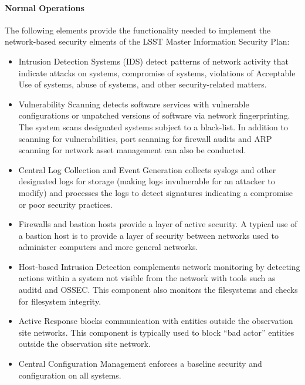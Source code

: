 \paragraph{Normal Operations}

The following elements provide the functionality needed to implement the
network-based security elments of the LSST Master Information Security Plan:

\begin{itemize}

\item Intrusion Detection Systems (IDS) detect patterns of network activity that
indicate attacks on systems, compromise of systems, violations of Acceptable Use
of systems, abuse of systems, and other security-related matters.

\item Vulnerability Scanning detects software services with vulnerable
configurations or unpatched versions of software via network fingerprinting. The
system scans designated systems subject to a black-list. In addition to scanning
for vulnerabilities, port scanning for firewall audits and ARP scanning for
network asset management can also be conducted.

\item Central Log Collection and Event Generation collects syslogs and other
designated logs for storage (making logs invulnerable for an attacker to modify)
and processes the logs to detect signatures indicating a compromise or poor
security practices.

\item Firewalls and bastion hosts provide a layer of active security. A typical
use of a bastion host is to provide a layer of security between networks used to
administer computers and more general networks.

\item Host-based Intrusion Detection complements network monitoring by detecting
actions within a system not visible from the network with tools such as auditd
and OSSEC. This component also monitors the filesystems and checks for filesystem
integrity.

\item Active Response blocks communication with entities outside the observation site
networks. This component is typically used to block “bad actor” entities outside
the observation site network.

\item Central Configuration Management enforces a baseline security and configuration
on all systems.

\end{itemize}

